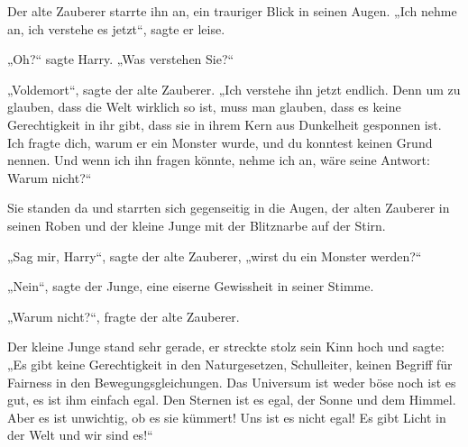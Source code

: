 Der alte Zauberer starrte ihn an, ein trauriger Blick in seinen Augen.
„Ich nehme an, ich verstehe es jetzt“, sagte er leise.

„Oh?“ sagte Harry.
„Was verstehen Sie?“

„Voldemort“, sagte der alte Zauberer.
„Ich verstehe ihn jetzt endlich. Denn um zu glauben, dass die Welt wirklich so ist, muss man glauben, dass es keine Gerechtigkeit in ihr gibt, dass sie in ihrem Kern aus Dunkelheit gesponnen ist. Ich fragte dich, warum er ein Monster wurde, und du konntest keinen Grund nennen. Und wenn ich ihn fragen könnte, nehme ich an, wäre seine Antwort: Warum nicht?“

\later

Sie standen da und starrten sich gegenseitig in die Augen, der alten Zauberer in seinen Roben und der kleine Junge mit der Blitznarbe auf der Stirn.

„Sag mir, Harry“, sagte der alte Zauberer, „wirst du ein Monster werden?“

„Nein“, sagte der Junge, eine eiserne Gewissheit in seiner Stimme.

„Warum nicht?“, fragte der alte Zauberer.

Der kleine Junge stand sehr gerade, er streckte stolz sein Kinn hoch und sagte:
„Es gibt keine Gerechtigkeit in den Naturgesetzen, Schulleiter, keinen Begriff für Fairness in den Bewegungsgleichungen. Das Universum ist weder böse noch ist es gut, es ist ihm einfach egal. Den Sternen ist es egal, der Sonne und dem Himmel. Aber es ist unwichtig, ob es sie kümmert! Uns ist es nicht egal! Es gibt Licht in der Welt und wir sind es!“

